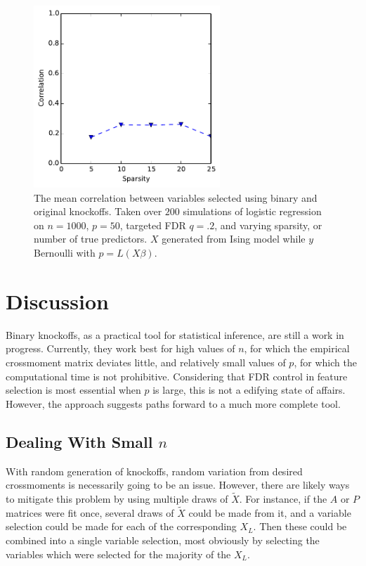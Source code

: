 \documentclass[11pt]{article}
\theoremstyle{definition}
\begin{document}
    \begin{figure}[h]
        \begin{center}
        \includegraphics[width=7cm]{images/logit_corr_50}
    \end{center}
    \caption{The mean correlation between variables selected using binary and original knockoffs. Taken over $200$ simulations of logistic regression on $n=1000$, $p=50$, targeted FDR $q=.2$, and varying sparsity, or number of true predictors. $X$ generated from Ising model while $y$ Bernoulli with $p=L(X\beta)$.}  
    \end{figure}

    \FloatBarrier

\section{Discussion}
    Binary knockoffs, as a practical tool for statistical inference, are still a work in progress. Currently, they work best for high values of $n$, for which the empirical crossmoment matrix deviates little, and relatively small values of $p$, for which the computational time is not prohibitive. Considering that FDR control in feature selection is most essential when $p$ is large, this is not a edifying state of affairs. However, the approach suggests paths forward to a much more complete tool. 
    
\subsection{Dealing With Small $n$}
    With random generation of knockoffs, random variation from desired crossmoments is necessarily going to be an issue. However, there are likely ways to mitigate this problem by using multiple draws of $\tilde X$. For instance, if the $A$ or $P$ matrices were fit once, several draws of $\tilde X$ could be made from it, and a variable selection could be made for each of the corresponding $X_L$. Then these could be combined into a single variable selection, most obviously by selecting the variables which were selected for the majority of the $X_L$. 
    
\end{document}
